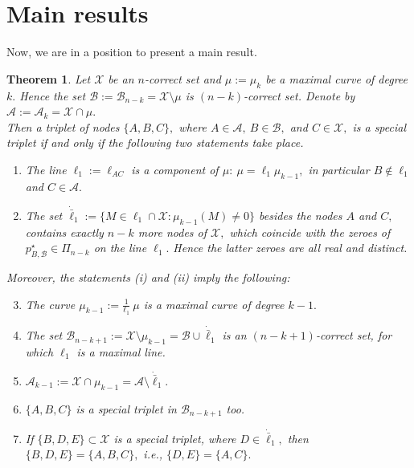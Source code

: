 \documentclass[a4paper,12pt]{article}
\newtheorem{theorem}[lemma]{Theorem}
\theoremstyle{definition}
\numberwithin{equation}{section}
\numberwithin{figure}{section}
\newcommand{\Aset}{\mathcal{A}}
\newcommand{\Bset}{\mathcal{B}}
\newcommand{\Xset}{\mathcal{X}}
\begin{document}
\section{Main results}
Now, we are in a position to present a main result.
\begin{theorem}\label{th1sptr}
Let $\Xset$ be an $n$-correct set and $\mu:=\mu_k$ be a maximal curve of degree $k.$ Hence the set $\Bset:=\Bset_{n-k}=\Xset\setminus \mu$ is $(n-k)$-correct set. Denote by $\Aset:=\Aset_{k}=\Xset\cap \mu.$\\ Then a triplet of nodes $\{A,B,C\},$ where $A \in \Aset,\ B\in \Bset,$ and $C \in \Xset,$ is a special triplet if and only if the following two statements take place.
\begin{enumerate}
\setlength{\itemsep}{0mm}
\item
The line $\ell_1:=\ell_{AC}$ is a component of $\mu:\ \mu=\ell_1\mu_{k-1},$ in particular $B\notin \ell_1$ and $C\in \Aset.$  
\item
The set $\dot{\bar \ell}_1:=\{M\in{\ell_1}\cap  \Xset: \mu_{k-1}(M)\neq 0\}$ besides the nodes $A$ and $C,$ contains exactly $n-k$ more nodes of $\Xset,$ which 
coincide with the zeroes of $p^\star_{B,\Bset}\in\Pi_{n-k}$ on the line $\ell_1.$ Hence the latter zeroes are all real and distinct.
\end{enumerate}
Moreover, the statements \emph{(i) and (ii)} imply the following:
\begin{enumerate}
\setcounter{enumi}{2}
\setlength{\itemsep}{0mm}
\item
The curve $\mu_{k-1}:=\frac{1}{\ell_1}\ \mu$ is a maximal curve of degree $k-1.$ 

\item
The set $\Bset_{n-k+1}:=\Xset\setminus\mu_{k-1}=\Bset\cup \dot{\bar \ell}_1$ is an  $(n-k+1)$-correct set, for which $\ell_1$ is a maximal line.  
\item
$\Aset_{k-1}:=\Xset\cap\mu_{k-1}=\Aset\setminus \dot{\bar \ell}_1.$
\item 
$\{A,B,C\}$ is a special triplet in $\Bset_{n-k+1}$ too.
 
\item
If $\{B,D,E\}\subset\Xset$  is a special triplet, where $D\in \dot{\bar \ell}_1,$ then $\{B,D,E\}=\{A,B,C\},$ i.e., $\{D,E\}=\{A,C\}.$
\end{enumerate}
\end{theorem}
\end{document}
